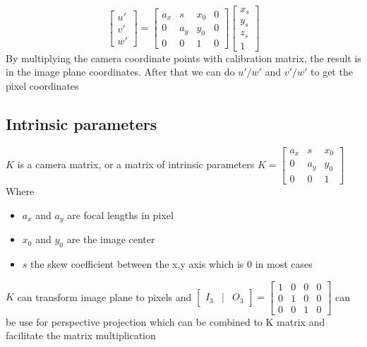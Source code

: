 \documentclass[a4paper, twoside, english]{article}
\begin{document}
\begin{equation*}
\begin{bmatrix}
u' \\
v' \\
w'
\end{bmatrix}
=
\begin{bmatrix}
a_x & s & x_0 & 0 \\
0 & a_y & y_0 & 0\\
0 & 0 & 1 & 0
\end{bmatrix}
\begin{bmatrix}
x_s \\
y_s \\
z_s \\
1
\end{bmatrix}
\end{equation*}
By multiplying the camera coordinate points with calibration matrix, the result is in the image plane coordinates. After that we can do $u'/w'$ and $v'/w'$ to get the pixel coordinates

\subsection{Intrinsic parameters}

$K$ is a camera matrix, or a matrix of intrinsic parameters $K=\begin{bmatrix}
a_x & s & x_0  \\
0 & a_y & y_0 \\
0 & 0 & 1
\end{bmatrix}$ 
Where \begin{itemize}
	\item $a_x$ and $a_y$ are focal lengths in pixel 
	\item $x_0$ and $y_0$ are the image center
	\item $s$ the skew coefficient between the x,y axis which is 0 in most cases \cite{CameraResectioning}\cite{OpenCVDocCameraCalib}
\end{itemize}
$K$ can transform image plane to pixels and $\begin{bmatrix}
I_3 &|& O_3 
\end{bmatrix}
=
\begin{bmatrix}
1 & 0 & 0 & 0 \\
0 & 1 & 0 & 0 \\
0 & 0 & 1 & 0
\end{bmatrix}$ can be use for perspective projection which can be combined to K matrix and facilitate the matrix multiplication
\end{document}
